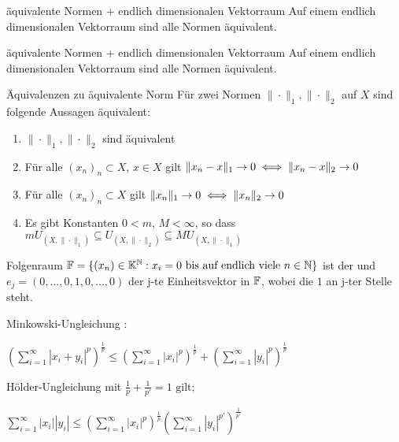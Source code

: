 	\begin{karte}{äquivalente Normen + endlich dimensionalen Vektorraum}
		Auf einem endlich dimensionalen Vektorraum sind alle Normen äquivalent.
	\end{karte}
	
	\begin{karte}{äquivalente Normen + endlich dimensionalen Vektorraum}
		Auf einem endlich dimensionalen Vektorraum sind alle Normen äquivalent.
	\end{karte}
	
	\begin{karte}{Äquivalenzen zu äquivalente Norm}
		Für zwei Normen $\| \cdot \|_{1}, \| \cdot \|_{2}$ auf $X$ sind folgende Aussagen äquivalent:
		\begin{enumerate}[label=\alph*\upshape)]
			\item $\| \cdot \|_{1}, \| \cdot \|_{2}$ sind äquivalent
			\item Für alle $(x_{n})_{n} \subset X$, $x \in X$ gilt $\| x_{n} - x \|_{1} \rightarrow 0 \iff \| x_{n} - x \|_{2} \rightarrow 0 $
			\item Für alle $(x_{n})_{n} \subset X$ gilt $\| x_{n} \|_{1} \rightarrow 0 \iff \| x_{n} \|_{2} \rightarrow 0 $
			\item Es gibt Konstanten $0 < m$, $M < \infty$, so dass $m U_{(X, \| \cdot \|_{1})} \subseteq U_{(X, \| \cdot \|_{2})} \subseteq M U_{(X, \| \cdot \|_{1})}$
		\end{enumerate}
	\end{karte}
	
	\begin{karte}{Folgenraum}	
		$\mathbb{F} = \{ (x_{n}) \in \mathbb{K}^{\mathbb{N}}: x_{i} = 0 \text{ bis auf endlich viele } n \in \mathbb{N} \} $ ist der  und $e_{j} = (0, \dotsc, 0, 1, 0, \dotsc, 0) $ der j-te Einheitsvektor in $\mathbb{F}$, wobei die $1$ an j-ter Stelle steht.
	\end{karte}		

	\begin{karte}{Minkowski-Ungleichung}
			: 
			
			$\left( \sum_{i=1}^{\infty} |x_{i} + y_{i}|^p\right)^{\frac{1}{p}} \leq\left( \sum_{i=1}^{\infty} |x_{i}|^p\right)^{\frac{1}{p}} + \left( \sum_{i=1}^{\infty} |y_{i}|^p\right)^{\frac{1}{p}} $	\\
	\end{karte}
	
	\begin{karte}{Hölder-Ungleichung}
		 mit $\frac{1}{p} + \frac{1}{p'} = 1 \text{ gilt; }$
		 
		 $\sum_{i=1}^{\infty} |x_{i}| |y_{i}| \leq \left( \sum_{i=1}^{\infty} |x_{i}|^{p} \right)^{\frac{1}{p}} \left( \sum_{i=1}^{\infty} |y_{i}|^{p'} \right)^{\frac{1}{p'}} $	
	\end{karte}
	
